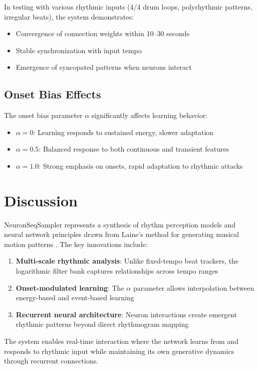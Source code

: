 \documentclass[11pt,a4paper]{article}
\begin{document}
In testing with various rhythmic inputs (4/4 drum loops, polyrhythmic patterns, irregular beats), the system demonstrates:
\begin{itemize}
\item Convergence of connection weights within 10--30 seconds
\item Stable synchronization with input tempo
\item Emergence of syncopated patterns when neurons interact
\end{itemize}

\subsection{Onset Bias Effects}

The onset bias parameter $\alpha$ significantly affects learning behavior:
\begin{itemize}
\item $\alpha = 0$: Learning responds to sustained energy, slower adaptation
\item $\alpha = 0.5$: Balanced response to both continuous and transient features
\item $\alpha = 1.0$: Strong emphasis on onsets, rapid adaptation to rhythmic attacks
\end{itemize}

\section{Discussion}

NeuronSeqSampler represents a synthesis of rhythm perception models \cite{todd1994} and neural network principles drawn from Laine's method for generating musical motion patterns \cite{laine2000}. The key innovations include:

\begin{enumerate}
\item \textbf{Multi-scale rhythmic analysis}: Unlike fixed-tempo beat trackers, the logarithmic filter bank captures relationships across tempo ranges
\item \textbf{Onset-modulated learning}: The $\alpha$ parameter allows interpolation between energy-based and event-based learning
\item \textbf{Recurrent neural architecture}: Neuron interactions create emergent rhythmic patterns beyond direct rhythmogram mapping
\end{enumerate}

The system enables real-time interaction where the network learns from and responds to rhythmic input while maintaining its own generative dynamics through recurrent connections.
\end{document}
